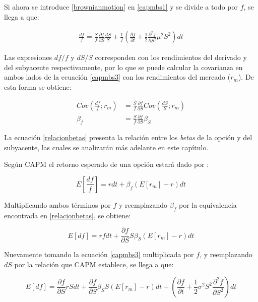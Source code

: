 Si ahora se introduce \eqref{brownianmotion} en \eqref{capmbs1} y se divide a todo por $f$, se llega a que:

\begin{align}
	\frac{df}{f} = \frac{S}{f} \frac{\partial f}{\partial S} \frac{dS}{S} +
		\frac{1}{f} \left( \frac{\partial f}{\partial t} +
			\frac{1}{2} \frac{\partial^2 f}{\partial S^2} \mu^2 S^2
		\right) dt \label{capmbs3}
\end{align}

Las expresiones $df/f$ y $dS/S$ corresponden con los rendimientos del derivado y del subyacente respectivamente, por lo que se puede calcular la covarianza en ambos lados de la ecuación \eqref{capmbs3} con los rendimientos del mercado ($r_m$). De esta forma se obtiene:

\begin{align}
	Cov(\frac{df}{f}; r_m) &= \frac{S}{f} \frac{\partial f}{\partial S} Cov(\frac{dS}{S}; r_m) \\
	\beta_f &= \frac{S}{f} \frac{\partial f}{\partial S} \beta_S \label{relacionbetas}
\end{align}

La ecuación \eqref{relacionbetas} presenta la relación entre los \textit{betas} de la opción y del subyacente, las cuales se analizarán más adelante en este capítulo.

Según CAPM el retorno esperado de una opción estará dado por \cite{frouah-formula}:

\begin{equation}
	E\left[ \frac{df}{f} \right] = r dt + \beta_f (E[r_m] - r) dt \label{opcionporcapm}
\end{equation}

Multiplicando ambos términos por $f$ y reemplazando $\beta_f$ por la equivalencia encontrada en \eqref{relacionbetas}, se obtiene:

\begin{equation}
	E[df] = r f dt + \frac{\partial f}{\partial S} S \beta_S (E[r_m] - r) dt
\end{equation}

Nuevamente tomando la ecuación \eqref{capmbs3} multiplicada por $f$, y reemplazando $dS$ por la relación que CAPM establece, se llega a que:

\begin{equation}
	E[df] = \frac{\partial f}{\partial S} r S dt + 
		\frac{\partial f}{\partial S} \beta_S S (E[r_m] - r) dt +
		( \frac{\partial f}{\partial t} + \frac{1}{2} \sigma^2 S^2 \frac{\partial^2 f}{\partial S^2}) dt
\end{equation}

